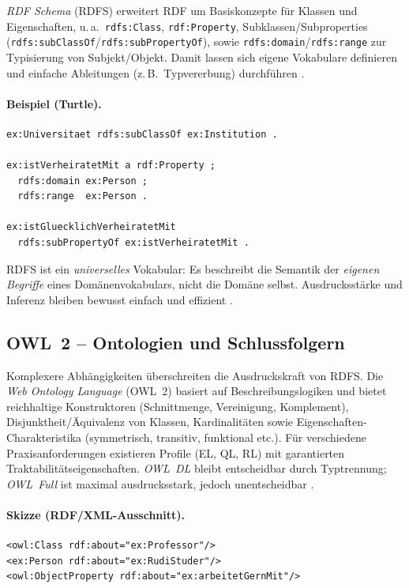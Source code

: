 \emph{RDF Schema} (RDFS) erweitert RDF um Basiskonzepte für Klassen und Eigenschaften, u.\,a.\ \texttt{rdfs:Class}, \texttt{rdf:Property}, Subklassen/Subproperties (\texttt{rdfs:subClassOf}/\texttt{rdfs:subPropertyOf}), sowie \texttt{rdfs:domain}/\texttt{rdfs:range} zur Typisierung von Subjekt/Objekt. Damit lassen sich eigene Vokabulare definieren und einfache Ableitungen (z.\,B.\ Typvererbung) durchführen \cite{RDFS11,Hitzler}.

\paragraph{Beispiel (Turtle).}
\begin{lstlisting}
ex:Universitaet rdfs:subClassOf ex:Institution .

ex:istVerheiratetMit a rdf:Property ;
  rdfs:domain ex:Person ;
  rdfs:range  ex:Person .

ex:istGluecklichVerheiratetMit
  rdfs:subPropertyOf ex:istVerheiratetMit .
\end{lstlisting}

RDFS ist ein \emph{universelles} Vokabular: Es beschreibt die Semantik der \emph{eigenen Begriffe} eines Domänenvokabulars, nicht die Domäne selbst. Ausdrucksstärke und Inferenz bleiben bewusst einfach und effizient \cite{RDFS11}.

\subsection{OWL~2 -- Ontologien und Schlussfolgern}
\label{subsec:owl}

Komplexere Abhängigkeiten überschreiten die Ausdruckskraft von RDFS. Die \emph{Web Ontology Language} (OWL~2) basiert auf Beschreibungslogiken und bietet reichhaltige Konstruktoren (Schnittmenge, Vereinigung, Komplement), Disjunktheit/Äquivalenz von Klassen, Kardinalitäten sowie Eigenschaften-Charakteristika (symmetrisch, transitiv, funktional etc.). Für verschiedene Praxisanforderungen existieren Profile (EL, QL, RL) mit garantierten Traktabilitätseigenschaften. \emph{OWL~DL} bleibt entscheidbar durch Typtrennung; \emph{OWL~Full} ist maximal ausdrucksstark, jedoch unentscheidbar \cite{Hitzler,AntoniouVanHarmelen,OWL2Overview}.

\paragraph{Skizze (RDF/XML-Ausschnitt).}
\begin{lstlisting}
<owl:Class rdf:about="ex:Professor"/>
<ex:Person rdf:about="ex:RudiStuder"/>
<owl:ObjectProperty rdf:about="ex:arbeitetGernMit"/>
\end{lstlisting}

